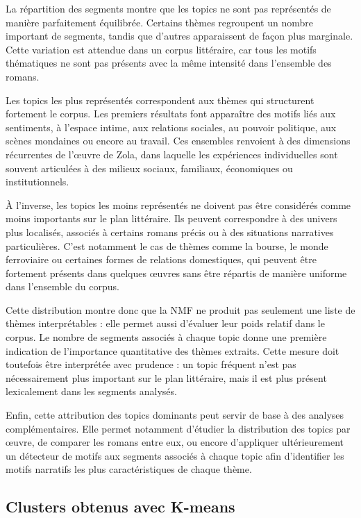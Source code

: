 La répartition des segments montre que les topics ne sont pas représentés de manière parfaitement équilibrée. Certains thèmes regroupent un nombre important de segments, tandis que d'autres apparaissent de façon plus marginale. Cette variation est attendue dans un corpus littéraire, car tous les motifs thématiques ne sont pas présents avec la même intensité dans l'ensemble des romans.

Les topics les plus représentés correspondent aux thèmes qui structurent fortement le corpus. Les premiers résultats font apparaître des motifs liés aux sentiments, à l'espace intime, aux relations sociales, au pouvoir politique, aux scènes mondaines ou encore au travail. Ces ensembles renvoient à des dimensions récurrentes de l'œuvre de Zola, dans laquelle les expériences individuelles sont souvent articulées à des milieux sociaux, familiaux, économiques ou institutionnels.

À l'inverse, les topics les moins représentés ne doivent pas être considérés comme moins importants sur le plan littéraire. Ils peuvent correspondre à des univers plus localisés, associés à certains romans précis ou à des situations narratives particulières. C'est notamment le cas de thèmes comme la bourse, le monde ferroviaire ou certaines formes de relations domestiques, qui peuvent être fortement présents dans quelques œuvres sans être répartis de manière uniforme dans l'ensemble du corpus.

Cette distribution montre donc que la NMF ne produit pas seulement une liste de thèmes interprétables : elle permet aussi d'évaluer leur poids relatif dans le corpus. Le nombre de segments associés à chaque topic donne une première indication de l'importance quantitative des thèmes extraits. Cette mesure doit toutefois être interprétée avec prudence : un topic fréquent n'est pas nécessairement plus important sur le plan littéraire, mais il est plus présent lexicalement dans les segments analysés.

Enfin, cette attribution des topics dominants peut servir de base à des analyses complémentaires. Elle permet notamment d'étudier la distribution des topics par œuvre, de comparer les romans entre eux, ou encore d'appliquer ultérieurement un détecteur de motifs aux segments associés à chaque topic afin d'identifier les motifs narratifs les plus caractéristiques de chaque thème.

\subsection{Clusters obtenus avec K-means}

